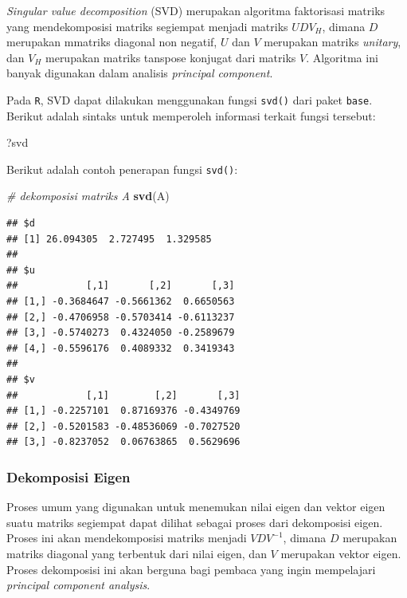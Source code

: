 \documentclass[]{book}
\newenvironment{Shaded}{\begin{snugshade}}{\end{snugshade}}
\newcommand{\CommentTok}[1]{\textcolor[rgb]{0.56,0.35,0.01}{\textit{#1}}}
\newcommand{\KeywordTok}[1]{\textcolor[rgb]{0.13,0.29,0.53}{\textbf{#1}}}
\newcommand{\NormalTok}[1]{#1}
\theoremstyle{definition}
\theoremstyle{definition}
\theoremstyle{definition}
\theoremstyle{remark}
\begin{document}
\emph{Singular value decomposition} (SVD) merupakan algoritma faktorisasi matriks yang mendekomposisi matriks segiempat menjadi matriks \(UDV_H\), dimana \(D\) merupakan mmatriks diagonal non negatif, \(U\) dan \(V\) merupakan matriks \emph{unitary}, dan \(V_H\) merupakan matriks tanspose konjugat dari matriks \(V\). Algoritma ini banyak digunakan dalam analisis \emph{principal component}.

Pada \texttt{R}, SVD dapat dilakukan menggunakan fungsi \texttt{svd()} dari paket \texttt{base}. Berikut adalah sintaks untuk memperoleh informasi terkait fungsi tersebut:

\begin{Shaded}
\begin{Highlighting}[]
\NormalTok{?svd}
\end{Highlighting}
\end{Shaded}

Berikut adalah contoh penerapan fungsi \texttt{svd()}:

\begin{Shaded}
\begin{Highlighting}[]
\CommentTok{# dekomposisi matriks A}
\KeywordTok{svd}\NormalTok{(A)}
\end{Highlighting}
\end{Shaded}

\begin{verbatim}
## $d
## [1] 26.094305  2.727495  1.329585
## 
## $u
##            [,1]       [,2]       [,3]
## [1,] -0.3684647 -0.5661362  0.6650563
## [2,] -0.4706958 -0.5703414 -0.6113237
## [3,] -0.5740273  0.4324050 -0.2589679
## [4,] -0.5596176  0.4089332  0.3419343
## 
## $v
##            [,1]        [,2]       [,3]
## [1,] -0.2257101  0.87169376 -0.4349769
## [2,] -0.5201583 -0.48536069 -0.7027520
## [3,] -0.8237052  0.06763865  0.5629696
\end{verbatim}

\hypertarget{eigendecomp}{%
\subsubsection{Dekomposisi Eigen}\label{eigendecomp}}

Proses umum yang digunakan untuk menemukan nilai eigen dan vektor eigen suatu matriks segiempat dapat dilihat sebagai proses dari dekomposisi eigen. Proses ini akan mendekomposisi matriks menjadi \(VDV^{-1}\), dimana \(D\) merupakan matriks diagonal yang terbentuk dari nilai eigen, dan \(V\) merupakan vektor eigen. Proses dekomposisi ini akan berguna bagi pembaca yang ingin mempelajari \emph{principal component analysis}.
\end{document}
